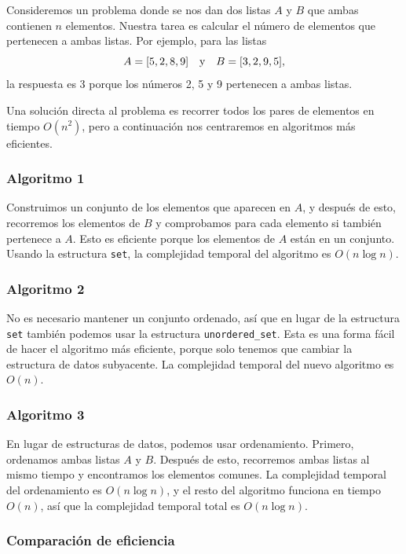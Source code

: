 Consideremos un problema donde
se nos dan dos listas $A$ y $B$
que ambas contienen $n$ elementos.
Nuestra tarea es calcular el número de elementos
que pertenecen a ambas listas.
Por ejemplo, para las listas
\[A = [5,2,8,9] \hspace{10px} \textrm{y} \hspace{10px} B = [3,2,9,5],\]
la respuesta es 3 porque los números 2, 5
y 9 pertenecen a ambas listas.

Una solución directa al problema es
recorrer todos los pares de elementos en tiempo $O(n^2)$,
pero a continuación nos centraremos en
algoritmos más eficientes.

\subsubsection{Algoritmo 1}

Construimos un conjunto de los elementos que aparecen en $A$,
y después de esto, recorremos los elementos
de $B$ y comprobamos para cada elemento si
también pertenece a $A$.
Esto es eficiente porque los elementos de $A$
están en un conjunto.
Usando la estructura \texttt{set},
la complejidad temporal del algoritmo es $O(n \log n)$.

\subsubsection{Algoritmo 2}

No es necesario mantener un conjunto ordenado,
así que en lugar de la estructura \texttt{set}
también podemos usar la estructura \texttt{unordered\_set}.
Esta es una forma fácil de hacer el algoritmo
más eficiente, porque solo tenemos que cambiar
la estructura de datos subyacente.
La complejidad temporal del nuevo algoritmo es $O(n)$.

\subsubsection{Algoritmo 3}

En lugar de estructuras de datos, podemos usar ordenamiento.
Primero, ordenamos ambas listas $A$ y $B$.
Después de esto, recorremos ambas listas
al mismo tiempo y encontramos los elementos comunes.
La complejidad temporal del ordenamiento es $O(n \log n)$,
y el resto del algoritmo funciona en tiempo $O(n)$,
así que la complejidad temporal total es $O(n \log n)$.

\subsubsection{Comparación de eficiencia}

